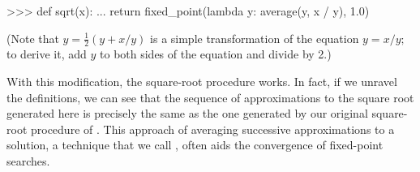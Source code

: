 \begin{codeBlock}
>>> def sqrt(x):
...     return fixed_point(lambda y: average(y, x / y), 1.0)
\end{codeBlock}

\noindent
(Note that \( y = \frac{1}{2}(y + x / y) \) is a simple transformation of the
equation \( y = x / y; \) to derive it, add \( y \) to both sides of the
equation and divide by 2.)

With this modification, the square-root procedure works.  In fact, if we
unravel the definitions, we can see that the sequence of approximations to the
square root generated here is precisely the same as the one generated by our
original square-root procedure of .  This approach of
averaging successive approximations to a solution, a technique that we call
, often aids the convergence of fixed-point searches.

